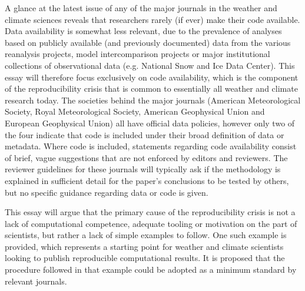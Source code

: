 A glance at the latest issue of any of the major journals in the weather and climate sciences reveals that researchers rarely (if ever) make their code available. Data availability is somewhat less relevant, due to the prevalence of analyses based on publicly available (and previously documented) data from the various reanalysis projects, model intercomparison projects or major institutional collections of observational data (e.g. National Snow and Ice Data Center). This essay will therefore focus exclusively on code availability, which is the component of the reproducibility crisis that is common to essentially all weather and climate research today. The societies behind the major journals (American Meteorological Society, Royal Meteorological Society, American Geophysical Union and European Geophysical Union) all have official data policies, however only two of the four indicate that code is included under their broad definition of data or metadata. Where code is included, statements regarding code availability consist of brief, vague suggestions that are not enforced by editors and reviewers. The reviewer guidelines for these journals will typically ask if the methodology is explained in sufficient detail for the paper's conclusions to be tested by others, but no specific guidance regarding data or code is given. 

This essay will argue that the primary cause of the reproducibility crisis is not a lack of computational competence, adequate tooling or motivation on the part of scientists, but rather a lack of simple examples to follow. One such example is provided, which represents a starting point for weather and climate scientists looking to publish reproducible computational results. It is proposed that the procedure followed in that example could be adopted as a minimum standard by relevant journals.
